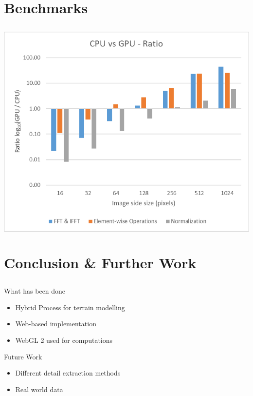\documentclass[aspectratio=169]{beamer}
\let\oldsection\section
\renewcommand{\section}[1]{
	\oldsection{#1}	
	\subsection{}
}
\newenvironment{myframe}[1][t]{\begin{frame}[#1]{\secname}{\subsecname}}{\end{frame}}
\begin{document}
	\section{Benchmarks}
	
	
%	
	\begin{myframe}[c]
		\vspace{-0.75cm}
		\centering
		\includegraphics[width=0.55\linewidth]{images/results/benchmarks/plot-ratios}
	\end{myframe}
	
	\section{Conclusion \& Further Work}
	
	\begin{myframe}
		\vspace{-0.5cm}
		\begin{block}{What has been done}
			\begin{itemize}
				\item Hybrid Process for terrain modelling
				\item Web-based implementation
				\item WebGL 2 used for computations
			\end{itemize}
		\end{block}
		
		\begin{block}{Future Work}
			\begin{itemize}
				\item Different detail extraction methods
				\item Real world data
			\end{itemize}
		\end{block}
	\end{myframe}
\end{document}
